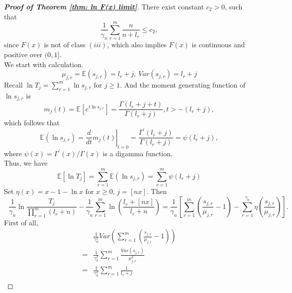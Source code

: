 \documentclass[12pt]{article}
\theoremstyle{plain}
\theoremstyle{definition}
\theoremstyle{remark}
\begin{document}
\begin{proof}[\textit{\textbf{Proof of Theorem \ref{thm: ln F(x) limit}}}]
    There exist constant $c_2>0$, such that $$\frac{1}{\gamma_{n}} \sum_{r=1}^{m} \frac{n}{n+l_{r}}\leq c_2,$$ since $F(x)$ is not of class $(iii)$, which also implies $F(x)$ is continuous and positive over $(0,1]$.\\
    We start with calculation.
    \begin{equation*}
        \mu_{j, r}=\mathbb{E}\left(s_{j, r}\right)=l_{r}+j,\ {Var}\left(s_{j, r}\right)=l_{r}+j
    \end{equation*}
    Recall $\ln T_{j}=\sum_{r=1}^{m} \ln s_{j, r} \text { for } j \geq 1$. And the moment generating function of $\ln s_{j, r}$ is
    \begin{equation*}
        m_{j}(t)=\mathbb{E}\left[e^{t \ln s_{j, r}}\right]=\frac{\Gamma\left(l_{r}+j+t\right)}{\Gamma\left(l_{r}+j\right)}, t>-(l_r+j),
    \end{equation*}
    which follows that
    \begin{equation*}
        \mathbb{E}\left(\ln s_{j, r}\right)=\left.\frac{d}{d t} m_{j}(t)\right|_{t=0}=\frac{\Gamma^{\prime}\left(l_{r}+j\right)}{\Gamma\left(l_{r}+j\right)}=\psi\left(l_{r}+j\right),
    \end{equation*}
    where $\psi(x)=\Gamma^{\prime}(x) / \Gamma(x)$ is a digamma function.\\
    Thus, we have
    \begin{equation*}
        \mathbb{E}\left[\ln T_{j}\right]=\sum_{r=1}^{m} \mathbb{E}\left(\ln s_{j, r}\right)=\sum_{r=1}^{m} \psi\left(l_{r}+j\right)
    \end{equation*}
    Set $\eta(x)=x-1-\ln x \text { for } x \geq 0$, $j=[nx]$. Then
    \begin{equation}\label{formular_lnT_mid}
    \ \ \ \dfrac{1}{\gamma_{n}}\ln \frac{T_{j}}{\prod_{r=1}^{m}(l_r+n)}-\dfrac{1}{\gamma_{n}} \sum_{r=1}^{m}\ln (\frac{l_r+[nx]}{l_r+n})=\dfrac{1}{\gamma_{n}}[\sum_{r=1}^{m}(\frac{s_{j,r}}{\mu_{j,r}}-1)-\sum_{r=1}^{\gamma_{n}}\eta(\frac{s_{j,r}}{\mu_{j,r}})].
    \end{equation}
    First of all,
    \begin{equation*}
        \begin{aligned}
            &\frac{1}{\gamma_{n}^2} {Var}\left(\sum_{r=1}^{m}\left(\frac{s_{j, r}}{\mu_{j, r}}-1\right)\right)\\
            =&\frac{1}{\gamma_{n}^2}\sum_{r=1}^{m} \frac{{Var}\left(s_{j, r}\right)}{\mu_{j, r}^{2}} \\ =&\frac{1}{\gamma_{n}^2}\sum_{r=1}^{m} \frac{1}{l_{r}+j} \\

\end{aligned}
\end{equation*}
\end{proof}
\end{document}
